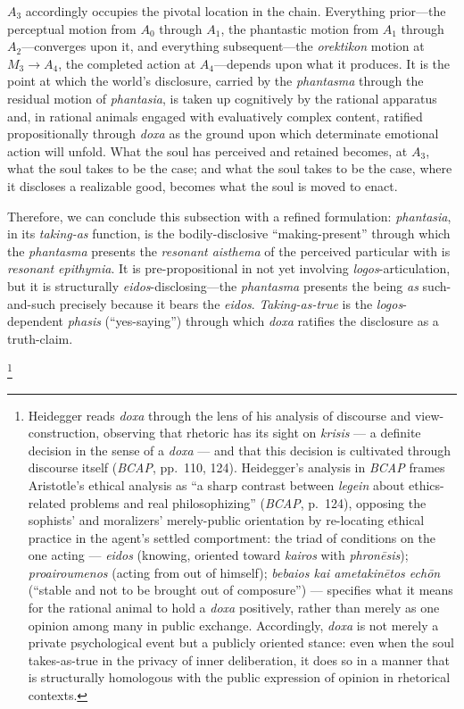 \documentclass{article}
\begin{document}
$A_3$ accordingly occupies the pivotal location in the chain. Everything prior---the perceptual motion from $A_0$ through $A_1$, the phantastic motion from $A_1$ through $A_2$---converges upon it, and everything subsequent---the \textit{orektikon} motion at $M_3 \rightarrow A_4$, the completed action at $A_4$---depends upon what it produces. It is the point at which the world's disclosure, carried by the \textit{phantasma} through the residual motion of \textit{phantasia}, is taken up cognitively by the rational apparatus and, in rational animals engaged with evaluatively complex content, ratified propositionally through \textit{doxa} as the ground upon which determinate emotional action will unfold. What the soul has perceived and retained becomes, at $A_3$, what the soul takes to be the case; and what the soul takes to be the case, where it discloses a realizable good, becomes what the soul is moved to enact.

Therefore, we can conclude this subsection with a refined formulation: \textit{phantasia}, in its \textit{taking-as} function, is the bodily-disclosive ``making-present'' through which the \textit{phantasma} presents the \textit{resonant aisthema} of the perceived particular with is \textit{resonant epithymia}. It is pre-propositional in not yet involving  \textit{logos}-articulation, but it is structurally \textit{eidos}-disclosing---the \textit{phantasma} presents the being \textit{as} such-and-such precisely because it bears the \textit{eidos}. \textit{Taking-as-true} is the \textit{logos}-dependent \textit{phasis} (``yes-saying'') through which \textit{doxa} ratifies the disclosure as a truth-claim. 

\footnote{Heidegger reads \textit{doxa} through the lens of his analysis of discourse and view-construction, observing that rhetoric has its sight on \textit{krisis} --- a definite decision in the sense of a \textit{doxa} --- and that this decision is cultivated through discourse itself (\textit{BCAP}, pp.~110, 124). Heidegger's analysis in \textit{BCAP} frames Aristotle's ethical analysis as ``a sharp contrast between \textit{legein} about ethics-related problems and real philosophizing'' (\textit{BCAP}, p.~124), opposing the sophists' and moralizers' merely-public orientation by re-locating ethical practice in the agent's settled comportment: the triad of conditions on the one acting --- \textit{eidos} (knowing, oriented toward \textit{kairos} with \textit{phron\=esis}); \textit{proairoumenos} (acting from out of himself); \textit{bebaios kai ametakin\=etos echōn} (``stable and not to be brought out of composure'') --- specifies what it means for the rational animal to hold a \textit{doxa} positively, rather than merely as one opinion among many in public exchange. Accordingly, \textit{doxa} is not merely a private psychological event but a publicly oriented stance: even when the soul takes-as-true in the privacy of inner deliberation, it does so in a manner that is structurally homologous with the public expression of opinion in rhetorical contexts.}
\end{document}
